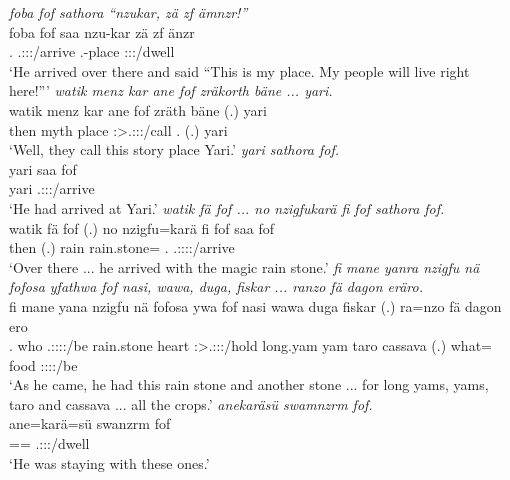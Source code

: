 \begin{exe}
	\emph{foba fof sathora ``nzukar, zä zf ämnzr!''}\\
	\gll foba fof saa nzu-kar zä zf änzr\\ 
	\Dist.{\Abl} {\Emph} \Tsg.\Masc:\Sbj:\Pst:\Pfv/arrive \Fsg.\Poss-place {\Prox} {\Imm} \Stpl:\Sbj:\Nonpast:\Ipfv/dwell\\
	\trans `He arrived over there and said ``This is my place. My people will live right here!'''
	\emph{watik menz kar ane fof zräkorth bäne ... yari.}\\
	\gll watik menz kar ane fof zräth bäne (.) yari\\ 
	then myth place {\Dem} {\Emph} \Stpl:\Sbj>\Tsg.\F:\Obj:\Irr:\Pfv/call \Recog.{\Abs} (.) yari\\
	\trans `Well, they call this story place Yari.'
\newpage 
{} 
	\emph{yari sathora fof.}\\
	\gll yari saa fof\\ 
	yari \Tsg.\Masc:\Sbj:\Pst:\Pfv/arrive {\Emph}\\
	\trans `He had arrived at Yari.'
	\emph{watik fä fof ... no nzigfukarä fi fof sathora fof.}\\
	\gll watik fä fof (.) no nzigfu=karä fi fof saa fof\\ 
	then {\Dist} {\Emph} (.) rain rain.stone={\Prop} \Third.{\Abs} {\Emph} \Tsg.\Masc:\Sbj:\Pst:\Pfv:\Venit/arrive {\Emph}\\
	\trans `Over there ... he arrived with the magic rain stone.'
	\emph{fi mane yanra nzigfu nä fofosa yfathwa fof nasi, wawa, duga, fiskar ... ranzo fä dagon eräro.}\\
	\gll fi mane yana nzigfu nä fofosa ywa fof nasi wawa duga fiskar (.) ra=nzo fä dagon ero\\ 
	\Third.{\Abs} who \Tsg.\Masc:\Sbj:\Pst:\Ipfv:\Venit/be rain.stone {\Indf} heart \Sg:\Sbj>\Tsg.\Masc:\Obj:\Pst:\Ipfv/hold {\Emph} long.yam yam taro cassava (.) what={\Only} {\Dist} food \Stpl:\Sbj:\Nonpast:\Ipfv:\Andat/be\\
	\trans `As he came, he had this rain stone and another stone ... for long yams, yams, taro and cassava ... all the crops.'
	\emph{anekaräsü swamnzrm fof.}\\
	\gll ane=karä=sü swanzrm fof\\ 
	\Dem=\Prop=\Etc{} \Tsg.\Masc:\Sbj:\Pst:\Dur/dwell {\Emph}\\
	\trans `He was staying with these ones.'

\end{exe}
